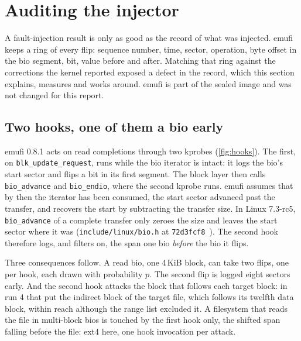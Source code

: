 \section{Auditing the injector}\label{sec:injector}

A fault-injection result is only as good as the record of what was
injected. emufi keeps a ring of every flip: sequence number, time,
sector, operation, byte offset in the bio segment, bit, value before and
after. Matching that ring against the corrections the kernel reported
exposed a defect in the record, which this section explains, measures
and works around. emufi is part of the sealed image and was not changed
for this report.

\subsection{Two hooks, one of them a bio early}

emufi 0.8.1 acts on read completions through two kprobes
(\cref{fig:hooks}). The first, on \texttt{blk\_update\_request}, runs
while the bio iterator is intact: it logs the bio's start sector and
flips a bit in its first segment. The block layer then calls
\texttt{bio\_advance} and \texttt{bio\_endio}, where the second kprobe
runs. emufi assumes that by then the iterator has been consumed, the
start sector advanced past the transfer, and recovers the start by
subtracting the transfer size. In Linux 7.3-rc5, \texttt{bio\_advance}
of a complete transfer only zeroes the size and leaves the start sector
where it was (\texttt{include/linux/bio.h} at
\texttt{72d3fcf8}~\cite{linux73rc5}). The second hook therefore logs,
and filters on, the span one bio \emph{before} the bio it flips.

Three consequences follow. A \bfs read bio, one 4\,KiB block, can take
two flips, one per hook, each drawn with probability $p$. The second
flip is logged eight sectors early. And the second hook attacks the
block that follows each target block: in run 4 that put the indirect
block of the target file, which follows its twelfth data block, within
reach although the range list excluded it. A filesystem that reads the
file in multi-block bios is touched by the first hook only, the shifted
span falling before the file: ext4 here, one hook invocation per attack.

